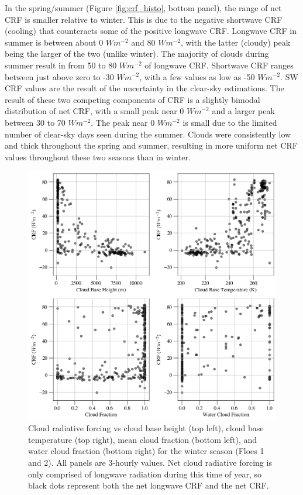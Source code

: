 In the spring/summer (Figure \ref{fig:crf_histo}, bottom panel), the range of net CRF is smaller relative to winter. This is due to the negative shortwave CRF (cooling) that counteracts some of the positive longwave CRF. Longwave CRF in summer is between about 0 $Wm^{-2}$ and 80 $Wm^{-2}$, with the latter (cloudy) peak being the larger of the two (unlike winter). The majority of clouds during summer result in from 50 to 80 $Wm^{-2}$ of longwave CRF. Shortwave CRF ranges between just above zero to -30 $Wm^{-2}$, with a few values as low as -50 $Wm^{-2}$. SW CRF values are the result of the uncertainty in the clear-sky estimations. The result of these two competing components of CRF is a slightly bimodal distribution of net CRF, with a small peak near 0 $Wm^{-2}$ and a larger peak between 30 to 70 $Wm^{-2}$. The peak near 0 $Wm^{-2}$ is small due to the limited number of clear-sky days seen during the summer. Clouds were consistently low and thick throughout the spring and summer, resulting in more uniform net CRF values throughout these two seasons than in winter.

\begin{figure}[p]
    \centering
    \includegraphics[width=1\linewidth]{figures/chapter4/VSWinter.png}
    \caption[Cloud radiative forcing vs cloud base height, cloud base temperature, cloud fraction, and water cloud fraction for winter.]{Cloud radiative forcing vs cloud base height (top left), cloud base temperature (top right), mean cloud fraction (bottom left), and water cloud fraction (bottom right) for the winter season (Floes 1 and 2). All panels are 3-hourly values. Net cloud radiative forcing is only comprised of longwave radiation during this time of year, so black dots represent both the net longwave CRF and the net CRF.}
    \label{fig:winter:crf}
\end{figure}

